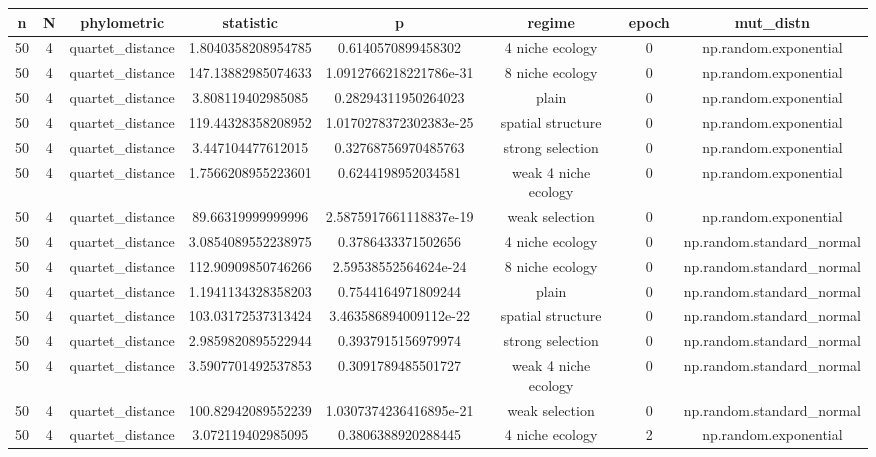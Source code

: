 \begin{table}[h!]
  \centering
  \begin{tabular}{||c c c c c c c c||}
   \hline
   n & N & phylometric & statistic & p & regime & epoch & mut\_distn \\  [0.5ex]
   \hline\hline
50 & 4 & quartet\_distance & 1.8040358208954785 & 0.6140570899458302 & 4 niche ecology & 0 & np.random.exponential \\ 
50 & 4 & quartet\_distance & 147.13882985074633 & 1.0912766218221786e-31 & 8 niche ecology & 0 & np.random.exponential \\ 
50 & 4 & quartet\_distance & 3.808119402985085 & 0.28294311950264023 & plain & 0 & np.random.exponential \\ 
50 & 4 & quartet\_distance & 119.44328358208952 & 1.0170278372302383e-25 & spatial structure & 0 & np.random.exponential \\ 
50 & 4 & quartet\_distance & 3.447104477612015 & 0.32768756970485763 & strong selection & 0 & np.random.exponential \\ 
50 & 4 & quartet\_distance & 1.7566208955223601 & 0.6244198952034581 & weak 4 niche ecology & 0 & np.random.exponential \\ 
50 & 4 & quartet\_distance & 89.66319999999996 & 2.5875917661118837e-19 & weak selection & 0 & np.random.exponential \\ 
50 & 4 & quartet\_distance & 3.0854089552238975 & 0.3786433371502656 & 4 niche ecology & 0 & np.random.standard\_normal \\ 
50 & 4 & quartet\_distance & 112.90909850746266 & 2.59538552564624e-24 & 8 niche ecology & 0 & np.random.standard\_normal \\ 
50 & 4 & quartet\_distance & 1.1941134328358203 & 0.7544164971809244 & plain & 0 & np.random.standard\_normal \\ 
50 & 4 & quartet\_distance & 103.03172537313424 & 3.463586894009112e-22 & spatial structure & 0 & np.random.standard\_normal \\ 
50 & 4 & quartet\_distance & 2.9859820895522944 & 0.3937915156979974 & strong selection & 0 & np.random.standard\_normal \\ 
50 & 4 & quartet\_distance & 3.5907701492537853 & 0.3091789485501727 & weak 4 niche ecology & 0 & np.random.standard\_normal \\ 
50 & 4 & quartet\_distance & 100.82942089552239 & 1.0307374236416895e-21 & weak selection & 0 & np.random.standard\_normal \\ 
50 & 4 & quartet\_distance & 3.072119402985095 & 0.3806388920288445 & 4 niche ecology & 2 & np.random.exponential \\ 

\end{tabular}
\end{table}
